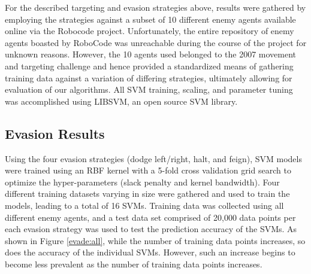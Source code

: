 \documentclass{article}
\theoremstyle{plain}
\theoremstyle{definition}
\theoremstyle{remark}
\begin{document}
For the described targeting and evasion strategies above, results were gathered by employing the strategies against a subset of 10 different enemy agents available online via the Robocode project. Unfortunately, the entire repository of enemy agents boasted by RoboCode was unreachable during the course of the project for unknown reasons. However, the 10 agents used belonged to the 2007 movement and targeting challenge and hence provided a standardized means of gathering training data against a variation of differing strategies, ultimately allowing for evaluation of our algorithms. All SVM training, scaling, and parameter tuning was accomplished using LIBSVM, an open source SVM library\cite{libsvm}.

\subsection*{Evasion Results}
Using the four evasion strategies (dodge left/right, halt, and feign), SVM models were trained using an RBF kernel with a 5-fold cross validation grid search to optimize the hyper-parameters (slack penalty and kernel bandwidth). Four different training datasets varying in size were gathered and used to train the models, leading to a total of 16 SVMs. Training data was collected using all different enemy agents, and a test data set comprised of 20,000 data points per each evasion strategy was used to test the prediction accuracy of the SVMs. As shown in Figure \ref{evade:all}, while the number of training data points increases, so does the accuracy of the individual SVMs. However, such an increase begins to become less prevalent as the number of training data points increases.
\end{document}
